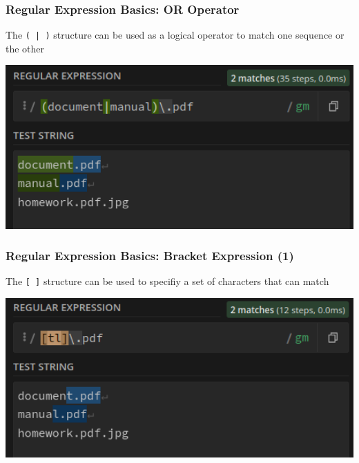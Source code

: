 \documentclass{beamer}
\begin{document}
\begin{frame}[fragile]
    \frametitle{Regular Expression Basics: OR Operator}
    \begin{center}
        The \texttt{\Large ( | )} structure can be used as a logical operator to match one sequence or the other
    \end{center}
    \begin{center}
        \includegraphics[width=1.0\textwidth]{pics/regex/regex16.png}
    \end{center}
\end{frame}

\begin{frame}[fragile]
    \frametitle{Regular Expression Basics: Bracket Expression (1)}
    \begin{center}
        The \texttt{\Large [ \;  ]} structure can be used to specifiy a set of characters that can match
    \end{center}
    \begin{center}
        \includegraphics[width=1.0\textwidth]{pics/regex/regex4.png}
    \end{center}
\end{frame}
\end{document}

